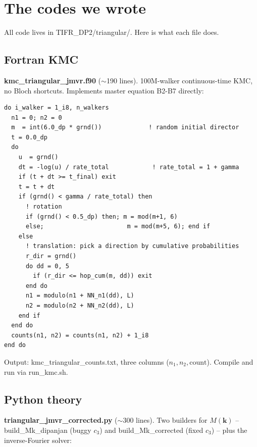 \documentclass[11pt,a4paper]{article}
\newcommand{\vk}{\mathbf{k}}
\begin{document}
\section{The codes we wrote}\label{sec:codes}

All code lives in {\sf TIFR\_DP2/triangular/}. Here is what each file does.

\subsection{Fortran KMC}\label{ssec:fortran}

\textbf{{\sf kmc\_triangular\_jmvr.f90}} ($\sim$190 lines). 100M-walker
continuous-time KMC, no Bloch shortcuts. Implements master equation
B2-B7 directly:

\begin{lstlisting}[style=fortranstyle]
do i_walker = 1_i8, n_walkers
  n1 = 0; n2 = 0
  m  = int(6.0_dp * grnd())             ! random initial director
  t = 0.0_dp
  do
    u  = grnd()
    dt = -log(u) / rate_total            ! rate_total = 1 + gamma
    if (t + dt >= t_final) exit
    t = t + dt
    if (grnd() < gamma / rate_total) then
      ! rotation
      if (grnd() < 0.5_dp) then; m = mod(m+1, 6)
      else;                       m = mod(m+5, 6); end if
    else
      ! translation: pick a direction by cumulative probabilities
      r_dir = grnd()
      do dd = 0, 5
        if (r_dir <= hop_cum(m, dd)) exit
      end do
      n1 = modulo(n1 + NN_n1(dd), L)
      n2 = modulo(n2 + NN_n2(dd), L)
    end if
  end do
  counts(n1, n2) = counts(n1, n2) + 1_i8
end do
\end{lstlisting}

Output: {\sf kmc\_triangular\_counts.txt}, three columns
($n_1, n_2, \textrm{count}$). Compile and run via {\sf run\_kmc.sh}.

\subsection{Python theory}\label{ssec:py-theory}

\textbf{{\sf triangular\_jmvr\_corrected.py}} ($\sim$300 lines). Two
builders for $M(\vk)$ -- {\sf build\_Mk\_dipanjan} (buggy $c_3$) and
{\sf build\_Mk\_corrected} (fixed $c_3$) -- plus the inverse-Fourier
solver:
\end{document}
